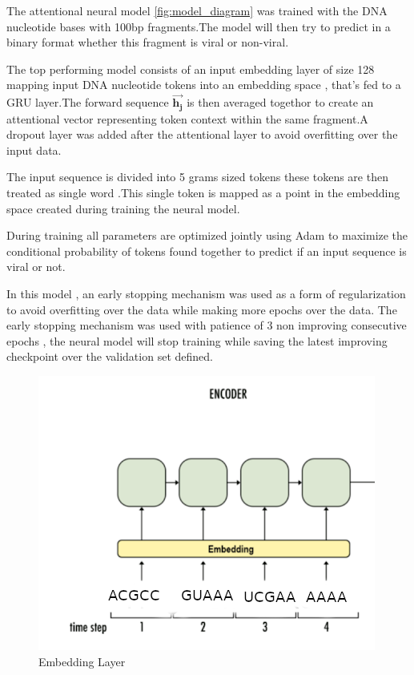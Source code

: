 \documentclass[conference]{IEEEtran}
\begin{document}
 The attentional neural model \ref{fig:model_diagram} was trained with the DNA nucleotide bases with 100bp fragments.The model will then try to predict in a binary format whether this fragment is viral or non-viral.
 
The top performing model consists of an input embedding layer of size 128 mapping input DNA nucleotide tokens into an embedding space , that's fed to a GRU layer.The forward sequence $\mathbf{\overrightarrow{h_{j}}}$ is then averaged togethor to create an attentional vector representing token context within the same fragment.A dropout layer was added after the attentional layer to avoid overfitting over the input data.

The input sequence is divided into 5 grams sized tokens these tokens are then treated as single word .This single token is mapped as a point in the embedding space created during training the neural model.

During training all parameters are optimized jointly using Adam to maximize the conditional probability of tokens found together to predict if an input sequence is viral or not.

 In this model , an early stopping mechanism was used as a form of regularization to avoid overfitting over the data while making more epochs over the data. The early stopping mechanism was used with patience of 3 non  improving consecutive epochs , the neural model will stop training while saving the latest improving checkpoint over the validation set defined. 



\begin{figure}
	\centering
	\includegraphics[width=0.8\columnwidth]{imgs/encoder.PNG}
	\caption{Embedding Layer}
	\label{fig:encoder}
\end{figure}
\end{document}
